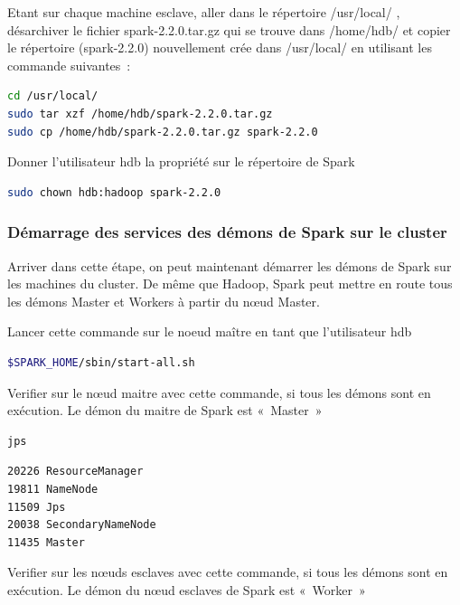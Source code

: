 \documentclass[12pt,english]{book}
\begin{document}
Etant sur chaque machine esclave, aller dans le répertoire /usr/local/ , désarchiver le fichier  spark-2.2.0.tar.gz qui se trouve dans /home/hdb/ et copier le répertoire (spark-2.2.0) nouvellement crée dans /usr/local/ en utilisant les commande suivantes :

\begin{lstlisting}[language=bash, frame=single, basicstyle=\footnotesize]
cd /usr/local/
sudo tar xzf /home/hdb/spark-2.2.0.tar.gz 
sudo cp /home/hdb/spark-2.2.0.tar.gz spark-2.2.0
\end{lstlisting}

Donner l’utilisateur hdb la propriété sur le répertoire de Spark

\begin{lstlisting}[language=bash, frame=single, basicstyle=\footnotesize]
sudo chown hdb:hadoop spark-2.2.0
\end{lstlisting}

\subsubsection{Démarrage des services des démons de Spark sur le cluster}

Arriver dans cette étape, on peut maintenant démarrer les démons de Spark sur les machines du cluster. De même que Hadoop, Spark peut mettre en route tous les démons Master et Workers à partir du nœud Master.

Lancer cette commande sur le noeud maître en tant que l’utilisateur hdb

\begin{lstlisting}[language=bash, frame=single, basicstyle=\footnotesize]
$SPARK_HOME/sbin/start-all.sh 
\end{lstlisting}

Verifier sur le nœud maitre avec cette commande, si tous les démons sont en exécution. Le démon du maitre de Spark est « Master »

\begin{lstlisting}[language=bash, frame=single, basicstyle=\footnotesize]
jps
\end{lstlisting}

\begin{lstlisting}[language=bash, frame=single, basicstyle=\footnotesize]
20226 ResourceManager
19811 NameNode
11509 Jps
20038 SecondaryNameNode
11435 Master
\end{lstlisting}

Verifier sur les nœuds esclaves avec cette commande, si tous les démons sont en exécution. Le démon du nœud esclaves de Spark est « Worker »
\end{document}
